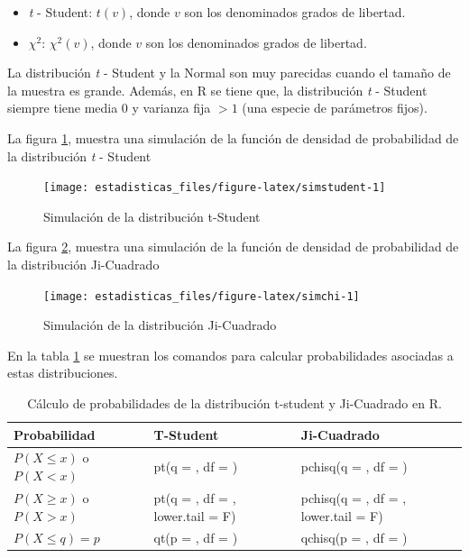\documentclass[
  11pt,
]{book}
\providecommand{\tightlist}{%
  \setlength{\itemsep}{0pt}\setlength{\parskip}{0pt}}
\newcommand{\gt}{>}
\newcommand{\lt}{<}
\theoremstyle{definition}
\theoremstyle{definition}
\theoremstyle{definition}
\theoremstyle{definition}
\theoremstyle{remark}
\begin{document}
\begin{itemize}
\tightlist
\item
  \emph{t} - Student: \(t(v)\), donde \(v\) son los denominados grados de libertad.
\item
  \(\chi^2\): \(\chi^2(v)\), donde \(v\) son los denominados grados de libertad.
\end{itemize}

La distribución \emph{t} - Student y la Normal son muy parecidas cuando el tamaño de la muestra es grande. Además, en R se tiene que, la distribución \emph{t} - Student siempre tiene media 0 y varianza fija \(> 1\) (una especie de parámetros fijos).

La figura \ref{fig:simstudent}, muestra una simulación de la función de densidad de probabilidad de la distribución \emph{t} - Student

\begin{figure}

{\centering \texttt{[image: estadisticas\_files/figure-latex/simstudent-1]} 

}

\caption{Simulación de la distribución t-Student}\label{fig:simstudent}
\end{figure}

La figura \ref{fig:simchi}, muestra una simulación de la función de densidad de probabilidad de la distribución Ji-Cuadrado

\begin{figure}

{\centering \texttt{[image: estadisticas\_files/figure-latex/simchi-1]} 

}

\caption{Simulación de la distribución Ji-Cuadrado}\label{fig:simchi}
\end{figure}

En la tabla \ref{tab:continuaRtchisq} se muestran los comandos para calcular probabilidades asociadas a estas distribuciones.

\begin{table}[H]
\centering
\caption{\label{tab:continuaRtchisq}Cálculo de probabilidades de la distribución t-student y Ji-Cuadrado en R.}
\centering
\begin{tabular}[t]{>{\raggedright\arraybackslash}p{3cm}>{\raggedright\arraybackslash}p{4cm}>{\raggedright\arraybackslash}p{4cm}}
\toprule
Probabilidad & T-Student & Ji-Cuadrado\\
\midrule
$P(X \leq x)$ o $P(X \lt x)$ & pt(q = , df = ) & pchisq(q = , df = )\\
$P(X \geq x)$ o $P(X \gt x)$ & pt(q = , df = , lower.tail = F) & pchisq(q = , df = , lower.tail = F)\\
$P(X \leq q) = p$ & qt(p = , df = ) & qchisq(p = , df = )\\
\bottomrule
\end{tabular}
\end{table}
\end{document}
